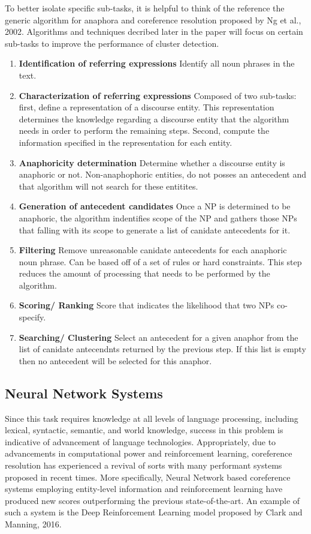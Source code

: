 \documentclass[11pt]{article}
\begin{document}
To better isolate specific sub-tasks, it is helpful to think of the reference the generic algorithm for anaphora and coreference resolution proposed by Ng et al., 2002. Algorithms and techniques decribed later in the paper will focus on certain sub-tasks to improve the performance of cluster detection. 
\begin{enumerate}
\item \textbf{Identification of referring expressions} Identify all noun phrases in the text. 
\item \textbf{Characterization of referring expressions} Composed of two sub-tasks: first, define a representation of a discourse entity. This representation determines the knowledge regarding a discourse entity that the algorithm needs in order to perform the remaining steps. Second, compute the information specified in the representation for each entity. 
\item \textbf{Anaphoricity determination} Determine whether a discourse entity is anaphoric or not. Non-anaphophoric entities, do not posses an antecedent and that algorithm will not search for these entitites. 
\item \textbf{Generation of antecedent candidates} Once a NP is determined to be anaphoric, the algorithm indentifies scope of the NP and gathers those NPs that falling with its scope to generate a list of canidate antecedents for it.
\item \textbf{Filtering} Remove unreasonable canidate antecedents for each anaphoric noun phrase. Can be based off of a set of rules or hard constraints. This step reduces the amount of processing that needs to be performed by the algorithm.
\item \textbf{Scoring/ Ranking} Score that indicates the likelihood that two NPs co-specify.
\item \textbf{Searching/ Clustering} Select an antecedent for a given anaphor from the list of canidate antecendnts returned by the previous step. If this list is empty then no antecedent will be selected for this anaphor. 
\end{enumerate}


\subsection{Neural Network Systems}
Since this task requires knowledge at all levels of language processing, including lexical, syntactic, semantic, and world knowledge, success in this problem is indicative of advancement of language technologies. Appropriately, due to advancements in computational power and reinforcement learning, coreference resolution has experienced a revival of sorts with many performant systems proposed in recent times. More specifically, Neural Network based coreference systems employing entity-level information and reinforcement learning have produced new scores outperforming the previous state-of-the-art. An example of such a system is the Deep Reinforcement Learning model proposed by Clark and Manning, 2016.
\end{document}
